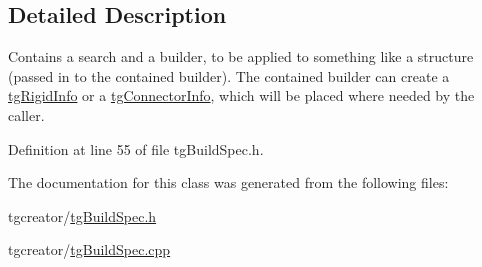 \subsection{Detailed Description}
Contains a search and a builder, to be applied to something like a structure (passed in to the contained builder). The contained builder can create a \hyperlink{classtg_rigid_info}{tg\-Rigid\-Info} or a \hyperlink{classtg_connector_info}{tg\-Connector\-Info}, which will be placed where needed by the caller. 

Definition at line 55 of file tg\-Build\-Spec.\-h.



The documentation for this class was generated from the following files\-:\begin{DoxyCompactItemize}
\item 
tgcreator/\hyperlink{tg_build_spec_8h}{tg\-Build\-Spec.\-h}\item 
tgcreator/\hyperlink{tg_build_spec_8cpp}{tg\-Build\-Spec.\-cpp}\end{DoxyCompactItemize}
